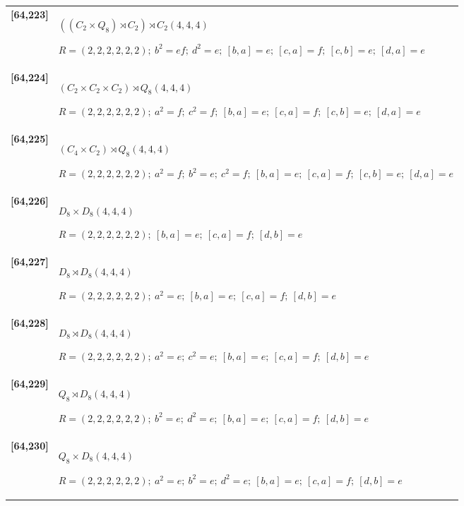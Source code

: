 \documentclass[UTF8,fontset=fandol,11pt,a4paper]{ctexart}
\begin{document}
\begin{longtable}{@{}p{17mm}>{\raggedright\arraybackslash}p{141mm}@{}}
\textbf{[64,223]} & $((C_{2}\times Q_{8})\rtimes C_{2})\rtimes C_{2}$\quad $(4,4,4)$\par\(R=(2,2,2,2,2,2);\allowbreak\ b^{2}=ef;\allowbreak\ d^{2}=e;\allowbreak\ [b,a]=e;\allowbreak\ [c,a]=f;\allowbreak\ [c,b]=e;\allowbreak\ [d,a]=e\)\\[3pt]

\textbf{[64,224]} & $(C_{2}\times C_{2}\times C_{2})\rtimes Q_{8}$\quad $(4,4,4)$\par\(R=(2,2,2,2,2,2);\allowbreak\ a^{2}=f;\allowbreak\ c^{2}=f;\allowbreak\ [b,a]=e;\allowbreak\ [c,a]=f;\allowbreak\ [c,b]=e;\allowbreak\ [d,a]=e\)\\[3pt]

\textbf{[64,225]} & $(C_{4}\times C_{2})\rtimes Q_{8}$\quad $(4,4,4)$\par\(R=(2,2,2,2,2,2);\allowbreak\ a^{2}=f;\allowbreak\ b^{2}=e;\allowbreak\ c^{2}=f;\allowbreak\ [b,a]=e;\allowbreak\ [c,a]=f;\allowbreak\ [c,b]=e;\allowbreak\ [d,a]=e\)\\[3pt]

\textbf{[64,226]} & $D_{8}\times D_{8}$\quad $(4,4,4)$\par\(R=(2,2,2,2,2,2);\allowbreak\ [b,a]=e;\allowbreak\ [c,a]=f;\allowbreak\ [d,b]=e\)\\[3pt]

\textbf{[64,227]} & $D_{8}\rtimes D_{8}$\quad $(4,4,4)$\par\(R=(2,2,2,2,2,2);\allowbreak\ a^{2}=e;\allowbreak\ [b,a]=e;\allowbreak\ [c,a]=f;\allowbreak\ [d,b]=e\)\\[3pt]

\textbf{[64,228]} & $D_{8}\rtimes D_{8}$\quad $(4,4,4)$\par\(R=(2,2,2,2,2,2);\allowbreak\ a^{2}=e;\allowbreak\ c^{2}=e;\allowbreak\ [b,a]=e;\allowbreak\ [c,a]=f;\allowbreak\ [d,b]=e\)\\[3pt]

\textbf{[64,229]} & $Q_{8}\rtimes D_{8}$\quad $(4,4,4)$\par\(R=(2,2,2,2,2,2);\allowbreak\ b^{2}=e;\allowbreak\ d^{2}=e;\allowbreak\ [b,a]=e;\allowbreak\ [c,a]=f;\allowbreak\ [d,b]=e\)\\[3pt]

\textbf{[64,230]} & $Q_{8}\times D_{8}$\quad $(4,4,4)$\par\(R=(2,2,2,2,2,2);\allowbreak\ a^{2}=e;\allowbreak\ b^{2}=e;\allowbreak\ d^{2}=e;\allowbreak\ [b,a]=e;\allowbreak\ [c,a]=f;\allowbreak\ [d,b]=e\)\\[3pt]


\end{longtable}
\end{document}
